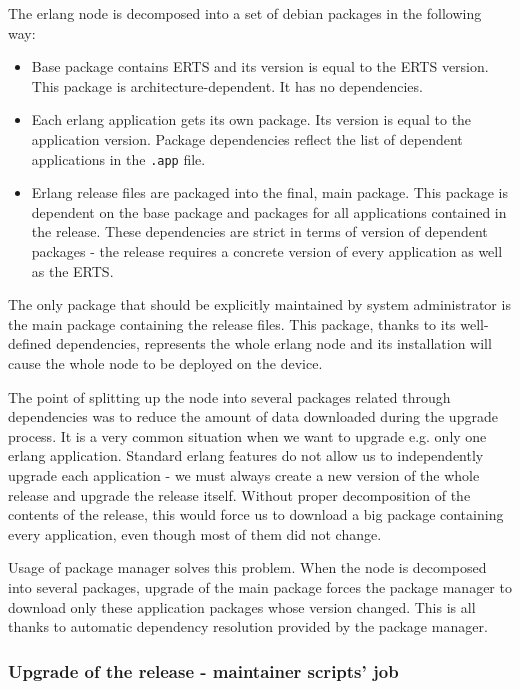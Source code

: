The erlang node is decomposed into a set of debian packages in the following way:
\begin{itemize}
\item Base package contains ERTS and its version is equal to the ERTS version. This package is
architecture-dependent. It has no dependencies.
\item Each erlang application gets its own package. Its version is equal to the application version.
Package dependencies reflect the list of dependent applications in the {\tt .app} file.
\item Erlang release files are packaged into the final, main package. This package is dependent on the base
package and packages for all applications contained in the release. These dependencies are strict in terms
of version of dependent packages - the release requires a concrete version of every application as well as the ERTS.
\end{itemize}

The only package that should be explicitly maintained by system administrator is the main package containing the release files.
This package, thanks to its well-defined dependencies, represents the whole erlang node and its installation will cause
the whole node to be deployed on the device.

The point of splitting up the node into several packages related through dependencies was to reduce the amount
of data downloaded during the upgrade process. It is a very common situation when we want to upgrade e.g. only
one erlang application. Standard erlang features do not allow us to independently upgrade each application - we must
always create a new version of the whole release and upgrade the release itself. Without proper decomposition of the contents
of the release, this would force us to download a big package containing every application, even though most of them did not change.

Usage of package manager solves this problem. When the node is decomposed into several packages, upgrade of the main package
forces the package manager to download only these application packages whose version changed. This is all thanks to automatic
dependency resolution provided by the package manager.

\subsubsection{Upgrade of the release - maintainer scripts' job}

